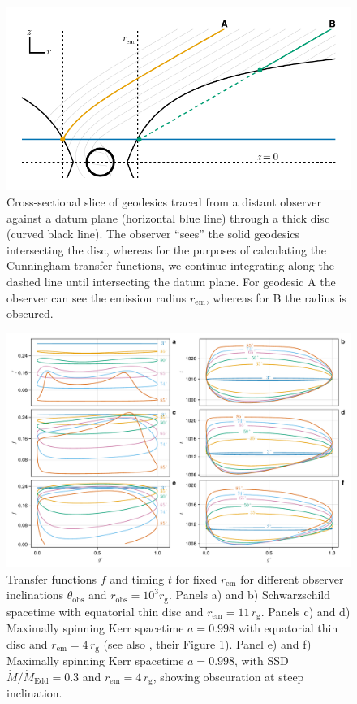 \documentclass[fleqn,usenatbib]{mnras}
\newcommand{\rg}{r_\text{g}}
\begin{document}
\begin{figure}
    \centering
    \includegraphics[width=0.95\linewidth]{figures/datum-plane.pdf}
    \caption{Cross-sectional slice of geodesics traced from a distant observer
        against a datum plane (horizontal blue line) through a thick disc
        (curved black line). The observer ``sees'' the solid geodesics
        intersecting the disc, whereas for the purposes of calculating the
        Cunningham transfer functions, we continue integrating along the dashed
        line until intersecting the datum plane. For geodesic A the observer
        can see the emission radius $r_\text{em}$, whereas for B the radius is
        obscured.
}
    \label{fig:datum-plane-tracing}
\end{figure}


\begin{figure}
    \centering
    \includegraphics[width=0.99\linewidth]{figures/transfer-functions.plots.pdf}
    \caption{Transfer functions $f$ and timing $t$ for fixed $r_\text{em}$ for different observer inclinations $\theta_\text{obs}$ and $r_\text{obs} = 10^3 \rg$. Panels a) and b) Schwarzschild spacetime with equatorial thin disc and $r_\text{em} = 11\, \rg$. Panels c) and d) Maximally spinning Kerr spacetime $a=0.998$ with equatorial thin disc and $r_\text{em} = 4 \, \rg$ (see also \citealp{bambi_testing_2017}, their Figure 1). Panel e) and f) Maximally spinning Kerr spacetime $a=0.998$, with SSD $\dot{M} / \dot{M}_\text{Edd} = 0.3$ and $r_\text{em} = 4\, \rg$, showing obscuration at steep inclination.}
    \label{fig:transfer-functions}
\end{figure}
\end{document}
